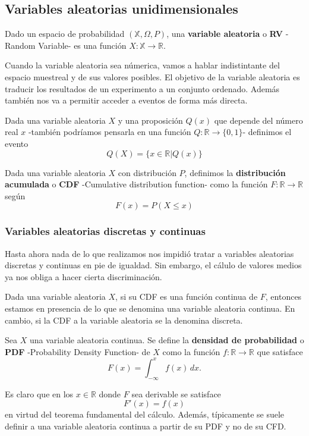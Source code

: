 \subsection{Variables aleatorias unidimensionales}
\begin{definition}
    Dado un espacio de probabilidad $(\mathbb{X},\Omega,P)$, una {\bf variable aleatoria} o {\bf RV} -Random Variable- es una función $X:\mathbb{X}\to \mathbb{R}$.
\end{definition}
Cuando la variable aleatoria sea númerica, vamos a hablar indistintante del espacio muestreal y de sus valores posibles. El objetivo de la variable aleatoria es traducir los resultados de un experimento a un conjunto ordenado. Además también nos va a permitir acceder a eventos de forma más directa.
\begin{definition}
    Dada una variable aleatoria $X$ y una proposición $Q(x)$ que depende del número real $x$ -también podríamos pensarla en una función $Q:\mathbb{R}\to \{0,1\}$- definimos el evento
    $$
        Q(X) = \{x\in\mathbb{R}| Q(x) \}
    $$
\end{definition}
\begin{definition}
    Dada una variable aleatoria $X$ con distribución $P$, definimos la {\bf distribución acumulada} o {\bf CDF} -Cumulative distribution function- como la función $F:\mathbb{R}\to \mathbb{R}$ según
    \begin{equation}
        F(x) = P(X\leq x)
    \end{equation}
\end{definition}
\subsubsection{Variables aleatorias discretas y continuas}
Hasta ahora nada de lo que realizamos nos impidió tratar a variables aleatorias discretas y continuas en pie de igualdad. Sin embargo, el cálulo de valores medios ya nos obliga a hacer cierta discriminación.\par
Dada una variable aleatoria $X$, si su CDF es una función continua de $F$, entonces estamos en presencia de lo que se denomina una variable aleatoria continua. En cambio, si la CDF a la variable aleatoria se la denomina discreta.
\begin{definition}
    Sea $X$ una variable aleatoria continua. Se define la {\bf densidad de probabilidad} o {\bf PDF} -Probability Density Function- de $X$ como la función $f:\mathbb{R}\to \mathbb{R}$ que satisface
    \begin{equation}
        F(x) = \int_{-\infty}^xf(x)\,dx.
    \end{equation}
\end{definition}
Es claro que en los $x\in \mathbb{R}$ donde $F$ sea derivable se satisface
\begin{equation}
    F'(x) = f(x)
\end{equation}
en virtud del teorema fundamental del cálculo. Además, típicamente se suele definir a una variable aleatoria continua a partir de su PDF y no de su CFD.
